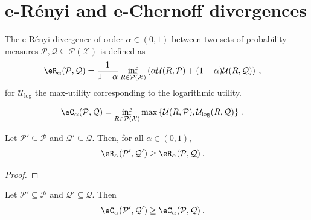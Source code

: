 \chapter{e-Rényi and e-Chernoff divergences}

\begin{definition}\label{def:erenyiDiv}
  \leanok
The e-Rényi divergence of order $\alpha \in (0,1)$ between two sets of probability measures $\mathcal{P}, \mathcal{Q} \subseteq \mathcal{P}(\mathcal{X})$ is defined as
\begin{align*}
  \eR_\alpha(\mathcal{P}, \mathcal{Q})
  &= \frac{1}{1 - \alpha} \inf_{R \in \mathcal{P}(\mathcal{X})} \left( \alpha \mathcal{U}(R, \mathcal{P}) + (1 - \alpha) \mathcal{U}(R, \mathcal{Q}) \right)
  \: ,
\end{align*}
for $\mathcal{U}_{\log}$ the max-utility corresponding to the logarithmic utility.
\end{definition}


\begin{definition}\label{def:echernoffDiv}
  \leanok
\begin{align*}
  \eC_\alpha(\mathcal{P}, \mathcal{Q})
  &= \inf_{R \in \mathcal{P}(\mathcal{X})} \max\left\{\mathcal{U}(R, \mathcal{P}), \mathcal{U}_{\log}(R, \mathcal{Q}) \right\}
  \: .
\end{align*}
\end{definition}


\begin{lemma}\label{lem:erenyiDiv_anti}
  \leanok
Let $\mathcal{P}' \subseteq \mathcal{P}$ and $\mathcal{Q}' \subseteq \mathcal{Q}$.
Then, for all $\alpha \in (0, 1)$,
\begin{align*}
  \eR_\alpha(\mathcal{P}', \mathcal{Q}')
  &\ge \eR_\alpha(\mathcal{P}, \mathcal{Q})
  \: .
\end{align*}
\end{lemma}

\begin{proof}\leanok

\end{proof}


\begin{lemma}\label{lem:echernoffDiv_anti}
  \leanok
Let $\mathcal{P}' \subseteq \mathcal{P}$ and $\mathcal{Q}' \subseteq \mathcal{Q}$.
Then
\begin{align*}
  \eC_\alpha(\mathcal{P}', \mathcal{Q}')
  &\ge \eC_\alpha(\mathcal{P}, \mathcal{Q})
  \: .
\end{align*}
\end{lemma}

